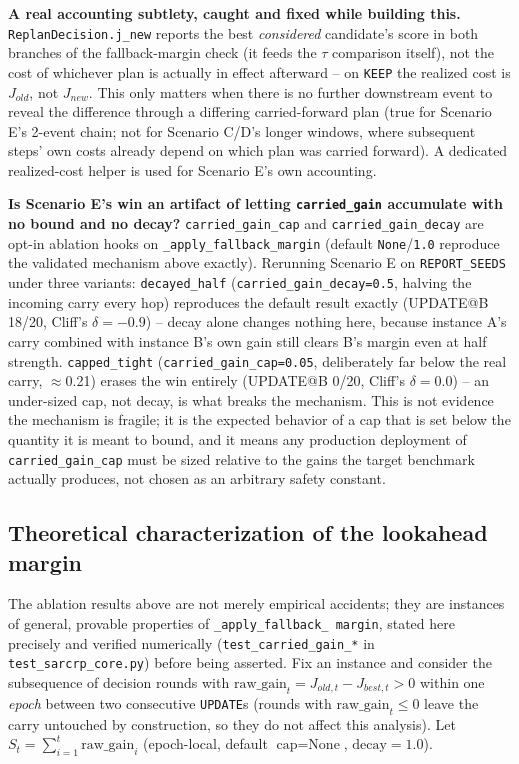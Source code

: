\documentclass[11pt]{article}
\begin{document}
\textbf{A real accounting subtlety, caught and fixed while building this.}
\texttt{ReplanDecision.j\_new} reports the best \emph{considered}
candidate's score in both branches of the fallback-margin check (it feeds
the $\tau$ comparison itself), not the cost of whichever plan is actually
in effect afterward -- on \texttt{KEEP} the realized cost is $J_{old}$,
not $J_{new}$. This only matters when there is no further downstream
event to reveal the difference through a differing carried-forward plan
(true for Scenario E's 2-event chain; not for Scenario C/D's longer
windows, where subsequent steps' own costs already depend on which plan
was carried forward). A dedicated realized-cost helper is used for
Scenario E's own accounting.

\textbf{Is Scenario E's win an artifact of letting \texttt{carried\_gain}
accumulate with no bound and no decay?} \texttt{carried\_gain\_cap} and
\texttt{carried\_gain\_decay} are opt-in ablation hooks on
\texttt{\_apply\_fallback\_margin} (default \texttt{None}/\texttt{1.0}
reproduce the validated mechanism above exactly). Rerunning Scenario E on
\texttt{REPORT\_SEEDS} under three variants: \texttt{decayed\_half}
(\texttt{carried\_gain\_decay=0.5}, halving the incoming carry every hop)
reproduces the default result exactly (UPDATE@B 18/20, Cliff's
$\delta=-0.9$) -- decay alone changes nothing here, because instance A's
carry combined with instance B's own gain still clears B's margin even at
half strength. \texttt{capped\_tight} (\texttt{carried\_gain\_cap=0.05},
deliberately far below the real carry, $\approx$0.21) erases the win
entirely (UPDATE@B 0/20, Cliff's $\delta=0.0$) -- an under-sized cap, not
decay, is what breaks the mechanism. This is not evidence the mechanism is
fragile; it is the expected behavior of a cap that is set below the
quantity it is meant to bound, and it means any production deployment of
\texttt{carried\_gain\_cap} must be sized relative to the gains the target
benchmark actually produces, not chosen as an arbitrary safety constant.

\subsection{Theoretical characterization of the lookahead margin}
\label{sec:theory}

The ablation results above are not merely empirical accidents; they are
instances of general, provable properties of \texttt{\_apply\_fallback\_
margin}, stated here precisely and verified numerically
(\texttt{test\_carried\_gain\_*} in \texttt{test\_sarcrp\_core.py}) before
being asserted. Fix an instance and consider the subsequence of decision
rounds with $\text{raw\_gain}_t = J_{old,t} - J_{best,t} > 0$ within one
\emph{epoch} between two consecutive \texttt{UPDATE}s (rounds with
$\text{raw\_gain}_t \leq 0$ leave the carry untouched by construction, so
they do not affect this analysis). Let $S_t = \sum_{i=1}^{t}
\text{raw\_gain}_i$ (epoch-local, default $\text{cap}=\text{None}$,
$\text{decay}=1.0$).
\end{document}
